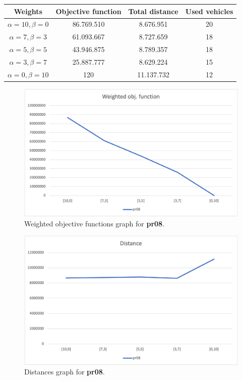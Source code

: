 {
\renewcommand{\arraystretch}{2}
\begin{longtable}[h]{| c | c | c | c |}
    \hline
    \textbf{Weights} & \textbf{Objective function} & \textbf{Total distance} & \textbf{Used vehicles} \\
    \hline
    \endhead
    $\alpha = 10, \beta = 0$ & 86.769.510 &  8.676.951 & 20 \\
    \hline
    $\alpha = 7, \beta = 3$  & 61.093.667 &  8.727.659 & 18 \\
    \hline
    $\alpha = 5, \beta = 5$  & 43.946.875 &  8.789.357 & 18 \\
    \hline
    $\alpha = 3, \beta = 7$  & 25.887.777 &  8.629.224 & 15 \\
    \hline
    $\alpha = 0, \beta = 10$ &        120 & 11.137.732 & 12 \\
    \hline
\end{longtable}
}
\begin{figure}[H]
    \centering
    \includegraphics[height=0.25\textheight]{../graphs/pr08-wobjf.png}
    \caption{Weighted objective functions graph for \textbf{pr08}.}
\end{figure}

\begin{figure}[H]
    \centering
    \includegraphics[height=0.25\textheight]{../graphs/pr08-distance.png}
    \caption{Distances graph for \textbf{pr08}.}
\end{figure}

